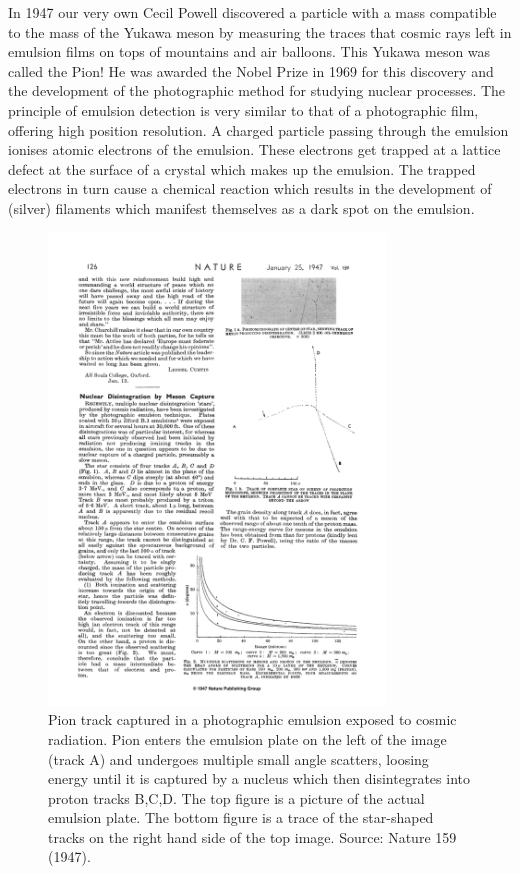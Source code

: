 In 1947 our very own Cecil Powell discovered a particle with a mass compatible to the mass of the Yukawa meson by measuring the traces that cosmic rays left in emulsion films on tops of mountains and air balloons. This Yukawa meson was called the Pion! He was awarded the Nobel Prize in 1969 for this discovery and the development of the photographic method for studying nuclear processes.
The principle of emulsion detection is very similar to that of a photographic film, offering high position resolution. A charged particle passing through the emulsion ionises atomic electrons of the emulsion. These electrons get trapped at a lattice defect at the surface of a crystal which makes up the emulsion. The trapped electrons in turn cause a chemical reaction which results in the development of (silver) filaments which manifest themselves as a dark spot on the emulsion.
\begin{figure}[!h]
\label{fig:pion_emulsion}
\begin{center}
\caption{Pion track captured in a photographic emulsion exposed to cosmic radiation. Pion enters the emulsion plate on the left of the image (track A) and undergoes multiple small angle scatters, loosing energy until it is captured by a nucleus which then disintegrates into proton tracks B,C,D. The top figure is a picture of the actual emulsion plate. The bottom figure is a trace of the star-shaped tracks on the right hand side of the top image. \textsf{Source: Nature 159 (1947)}.}
\includegraphics[width=0.80\textwidth]{fig/strongforce/pion_emulsion.pdf}
\end{center}
\end{figure}
